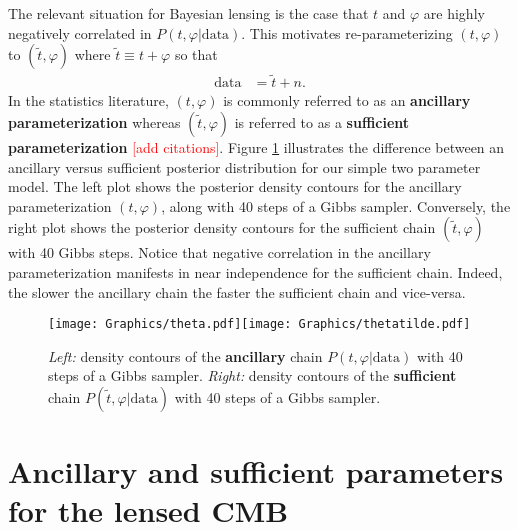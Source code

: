 \documentclass[noinfoline]{imsart}
\begin{document}
The relevant situation for Bayesian lensing is the case that $ t$ and $\varphi$ are highly negatively correlated in $P( t, \varphi|\text{data})$.  This motivates re-parameterizing $( t,\varphi)$ to $(\widetilde  t, \varphi)$ where $\widetilde  t \equiv  t + \varphi$ so that
\begin{align*}
\text{data} &= \widetilde  t + n.
\end{align*}
In the statistics literature,  $( t, \varphi)$ is commonly referred to as an {\bf ancillary parameterization} whereas $(\widetilde  t, \varphi)$ is referred to as a {\bf sufficient parameterization} \textcolor{red}{[add citations]}. Figure  \ref{fastslowGibbs} illustrates the difference between an ancillary versus sufficient posterior distribution for our simple two parameter model. The left plot shows the posterior density contours for the ancillary parameterization $( t, \varphi)$, along with 40 steps of a Gibbs sampler.  Conversely, the right plot shows the posterior density contours for the sufficient chain $(\widetilde  t, \varphi)$ with 40 Gibbs steps. Notice that negative correlation  in the ancillary parameterization manifests in near independence for the sufficient chain.  Indeed, the slower the ancillary chain the faster the sufficient chain and vice-versa. 
\begin{figure}[H]
\label{fastslowGibbs}
\texttt{[image: Graphics/theta.pdf]}\texttt{[image: Graphics/thetatilde.pdf]}
\caption{{\em Left:} density contours of the {\bf ancillary} chain $P( t, \varphi|\text{data})$ with 40 steps of a Gibbs sampler. {\em Right:} density contours of the {\bf sufficient}  chain $P(\widetilde  t, \varphi|\text{data})$ with 40 steps of a Gibbs sampler.}
\end{figure}
 





	
%
%
\section{Ancillary and sufficient parameters for the lensed CMB}
\end{document}
